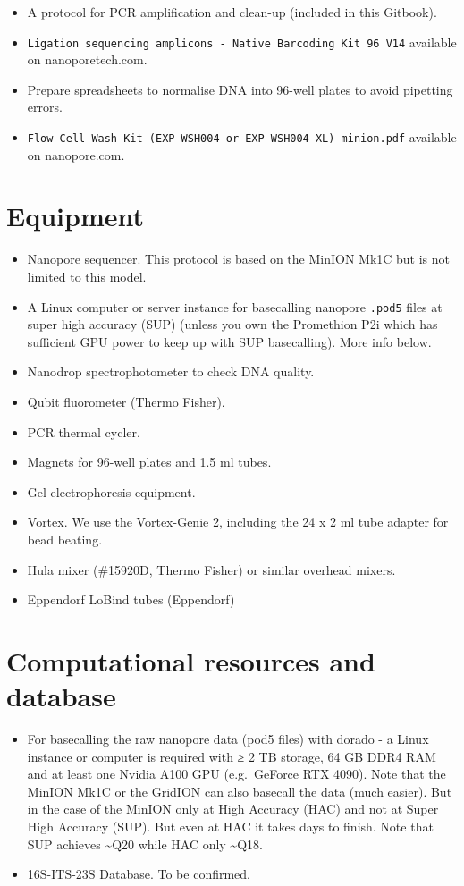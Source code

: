 \documentclass[
]{book}
\providecommand{\tightlist}{%
  \setlength{\itemsep}{0pt}\setlength{\parskip}{0pt}}
\begin{document}
\begin{itemize}
\tightlist
\item
  A protocol for PCR amplification and clean-up (included in this Gitbook).
\item
  \texttt{Ligation\ sequencing\ amplicons\ -\ Native\ Barcoding\ Kit\ 96\ V14} available on nanoporetech.com.
\item
  Prepare spreadsheets to normalise DNA into 96-well plates to avoid pipetting errors.
\item
  \texttt{Flow\ Cell\ Wash\ Kit\ (EXP-WSH004\ or\ EXP-WSH004-XL)-minion.pdf} available on nanopore.com.
\end{itemize}

\section{Equipment}\label{equipment}

\begin{itemize}
\tightlist
\item
  Nanopore sequencer. This protocol is based on the MinION Mk1C but is not limited to this model.
\item
  A Linux computer or server instance for basecalling nanopore \texttt{.pod5} files at super high accuracy (SUP) (unless you own the Promethion P2i which has sufficient GPU power to keep up with SUP basecalling). More info below.
\item
  Nanodrop spectrophotometer to check DNA quality.
\item
  Qubit fluorometer (Thermo Fisher).
\item
  PCR thermal cycler.
\item
  Magnets for 96-well plates and 1.5 ml tubes.
\item
  Gel electrophoresis equipment.
\item
  Vortex. We use the Vortex-Genie 2, including the 24 x 2 ml tube adapter for bead beating.
\item
  Hula mixer (\#15920D, Thermo Fisher) or similar overhead mixers.
\item
  Eppendorf LoBind tubes (Eppendorf)
\end{itemize}

\section{Computational resources and database}\label{computational-resources-and-database}

\begin{itemize}
\tightlist
\item
  For basecalling the raw nanopore data (pod5 files) with dorado - a Linux instance or computer is required with ≥ 2 TB storage, 64 GB DDR4 RAM and at least one Nvidia A100 GPU (e.g.~GeForce RTX 4090). Note that the MinION Mk1C or the GridION can also basecall the data (much easier). But in the case of the MinION only at High Accuracy (HAC) and not at Super High Accuracy (SUP). But even at HAC it takes days to finish. Note that SUP achieves \textasciitilde Q20 while HAC only \textasciitilde Q18.
\item
  16S-ITS-23S Database. To be confirmed.
\end{itemize}
\end{document}
